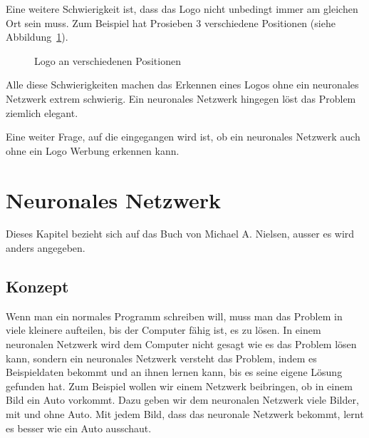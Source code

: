 \documentclass[12pt,a4paper]{report}
\begin{document}
Eine weitere Schwierigkeit ist, dass das Logo nicht unbedingt immer am gleichen Ort sein muss.
Zum Beispiel hat Prosieben 3 verschiedene Positionen (siehe Abbildung~\ref{fig:logo3}).
\begin{figure}[h]%
    \centering
    \qquad
    \qquad
    \caption{Logo an verschiedenen Positionen}%
    \label{fig:logo3}%
\end{figure}
Alle diese Schwierigkeiten machen das Erkennen eines Logos ohne ein neuronales Netzwerk extrem schwierig.
Ein neuronales Netzwerk hingegen löst das Problem ziemlich elegant.

Eine weiter Frage, auf die eingegangen wird ist, ob ein neuronales Netzwerk auch ohne ein Logo Werbung erkennen kann.


\chapter{Neuronales Netzwerk}
\label{ch:neuronalesNetzwerk}
Dieses Kapitel bezieht sich auf das Buch von Michael A. Nielsen\cite{neuralbook}, ausser es wird anders angegeben.
\section{Konzept}\label{sec:konzept}
Wenn man ein normales Programm schreiben will, muss man das Problem in viele kleinere aufteilen, bis der Computer fähig ist,
es zu lösen.
In einem neuronalen Netzwerk wird dem Computer nicht gesagt wie es das Problem lösen kann, sondern ein neuronales Netzwerk
versteht das Problem, indem es Beispieldaten bekommt und an ihnen lernen kann, bis es seine eigene Lösung gefunden hat.
Zum Beispiel wollen wir einem Netzwerk beibringen, ob in einem Bild ein Auto vorkommt.
Dazu geben wir dem neuronalen Netzwerk viele Bilder, mit und ohne Auto.
Mit jedem Bild, dass das neuronale Netzwerk bekommt, lernt es besser wie ein Auto ausschaut.
\end{document}
